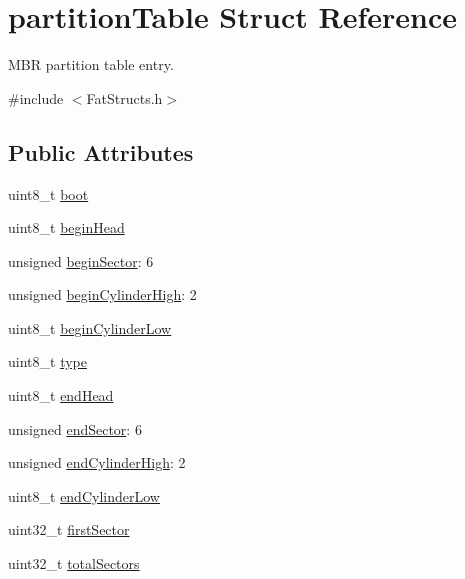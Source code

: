 \hypertarget{structpartition_table}{}\section{partition\+Table Struct Reference}
\label{structpartition_table}


M\+B\+R partition table entry.  




{\ttfamily \#include $<$Fat\+Structs.\+h$>$}

\subsection*{Public Attributes}
\begin{DoxyCompactItemize}
\item 
uint8\+\_\+t \hyperlink{structpartition_table_adf386afb1f33046d8b6a1a0afa780ec9}{boot}
\item 
uint8\+\_\+t \hyperlink{structpartition_table_a7d426694b8cf2151ae38568670a8c845}{begin\+Head}
\item 
unsigned \hyperlink{structpartition_table_ae201c11d9671c9efc307c654a2b6c026}{begin\+Sector}\+: 6
\item 
unsigned \hyperlink{structpartition_table_a744f0c7f9ad4c426b10de085b4f52392}{begin\+Cylinder\+High}\+: 2
\item 
uint8\+\_\+t \hyperlink{structpartition_table_a941fcb4df298f5f73ccca011bf40787a}{begin\+Cylinder\+Low}
\item 
uint8\+\_\+t \hyperlink{structpartition_table_a3861cf276c728c4dd30ca04e74197ee8}{type}
\item 
uint8\+\_\+t \hyperlink{structpartition_table_a4a3945bfd3a29f474984cb9f180dbd51}{end\+Head}
\item 
unsigned \hyperlink{structpartition_table_a27cdc4320c418ed0d833ab163ed77ad7}{end\+Sector}\+: 6
\item 
unsigned \hyperlink{structpartition_table_a32fea225b8ffd925ad919ffc56e9abda}{end\+Cylinder\+High}\+: 2
\item 
uint8\+\_\+t \hyperlink{structpartition_table_ad7829e34be70084abe145227b0d18274}{end\+Cylinder\+Low}
\item 
uint32\+\_\+t \hyperlink{structpartition_table_a02bbdff840c854dc96fa0b6da8589d86}{first\+Sector}
\item 
uint32\+\_\+t \hyperlink{structpartition_table_acf96e59ce648a9a0cf35751c3b6d7730}{total\+Sectors}
\end{DoxyCompactItemize}


